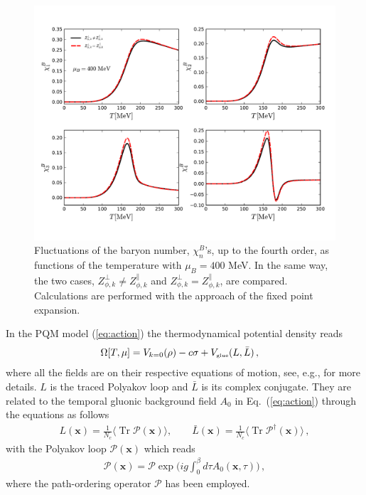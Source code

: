 \documentclass[%
reprint,
superscriptaddress,
showpacs,preprintnumbers,
 amsmath,amssymb,
 aps,
prd,
]{revtex4-1}
\newcommand{\Tr}{\ensuremath{\operatorname{Tr}}}
\def\Eq#1{Eq.~(\ref{#1})}
\begin{document}
%
\begin{figure}[t]
\includegraphics[width=1\textwidth]{chi}
\caption{Fluctuations of the baryon number, $\chi_n^B$'s, up to the fourth order, as functions of the temperature with  $\mu_B=400$ MeV. In the same way, the two cases, $Z_{\phi,k}^{\perp}\ne Z_{\phi,k}^{\parallel}$ and $Z_{\phi,k}^{\perp}=Z_{\phi,k}^{\parallel}$, are compared. Calculations are performed with the approach of the fixed point expansion.}\label{fig:chi}
\end{figure}
%

In the PQM model (\ref{eq:action}) the thermodynamical potential density reads
\begin{align}
  \Omega[T,\mu]&=V_{k=0}(\rho)-c\sigma+V_{\text{\tiny{glue}}}(L, \bar L)\,,\label{eq:omega}
\end{align}
where all the fields are on their respective equations of motion, see, e.g., \cite{Fu:2015naa} for more details. $L$ is the traced Polyakov loop and $\bar L$ is its complex conjugate. They are related to the temporal gluonic background field $A_0$ in \Eq{eq:action} through the equations as follows
\begin{align}
L(\bm x)=\frac{1}{N_c}\langle \Tr{\mathcal{P}(\bm x)} \rangle ,\qquad \bar{L} (\bm x)=\frac{1}{N_c}\langle \Tr{\mathcal{P}^{\dagger}(\bm x)} \rangle\,,\label{}
\end{align}
with the Polyakov loop $\mathcal{P}(\bm x)$ which reads
\begin{align}
\mathcal{P}(\bm x)=\mathcal{P}\exp\bigg( ig\int_{0}^{\beta}d\tau A_0(\bm x,\tau) \bigg)\,,\label{}
\end{align}
where the path-ordering operator $\mathcal{P}$ has been employed.
\end{document}
